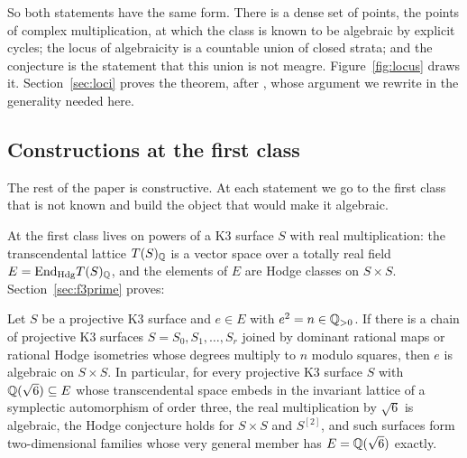 So both statements have the same form. There is a dense set of points, the points of complex multiplication, at which the class is known to be algebraic by explicit cycles; the locus of algebraicity is a countable union of closed strata; and the conjecture is the statement that this union is not meagre. Figure~\ref{fig:locus} draws it. Section~\ref{sec:loci} proves the theorem, after \cite{BMB26}, whose argument we rewrite in the generality needed here.

\subsection{Constructions at the first class}

The rest of the paper is constructive. At each statement we go to the first class that is not known and build the object that would make it algebraic.

At \Fiii{} the first class lives on powers of a K3 surface $S$ with real multiplication: the transcendental lattice $T(S)_{\mathbb{Q}}$ is a vector space over a totally real field $E=\mathrm{End}_{\mathrm{Hdg}}T(S)_{\mathbb{Q}}$, and the elements of $E$ are Hodge classes on $S\times S$. Section~\ref{sec:f3prime} proves:

\begin{theorem}\label{thm:intro-chain}
Let $S$ be a projective K3 surface and $e\in E$ with $e^{2}=n\in\mathbb{Q}_{>0}$. If there is a chain of projective K3 surfaces $S=S_{0},S_{1},\dots,S_{r}$ joined by dominant rational maps or rational Hodge isometries whose degrees multiply to $n$ modulo squares, then $e$ is algebraic on $S\times S$. In particular, for every projective K3 surface $S$ with $\mathbb{Q}(\sqrt6)\subseteq E$ whose transcendental space embeds in the invariant lattice of a symplectic automorphism of order three, the real multiplication by $\sqrt6$ is algebraic, the Hodge conjecture holds for $S\times S$ and $S^{[2]}$, and such surfaces form two-dimensional families whose very general member has $E=\mathbb{Q}(\sqrt6)$ exactly.
\end{theorem}

